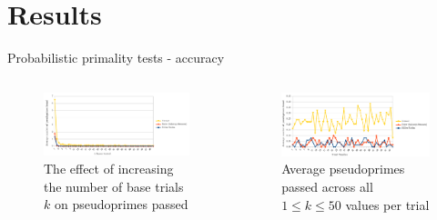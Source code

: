 \documentclass[pdf,aspectratio=169]{beamer}
\begin{document}
\section{Results}
\begin{frame}{Probabilistic primality tests - accuracy}
    \begin{columns}[t, onlytextwidth]
        \begin{column}{0.48\textwidth}
            \begin{figure}
                \setcounter{figure}{0}
                \caption{The effect of increasing the number of base trials $k$ on pseudoprimes passed}
                \centering
                \includegraphics[width=\textwidth]{pprimes_v_bases}
            \end{figure}
        \end{column}
        \begin{column}{0.48\textwidth}
            \begin{figure}
                \setcounter{figure}{1}
                \caption{Average pseudoprimes passed across all $1 \leq k \leq 50$ values per trial}
                \centering
                \includegraphics[width=\textwidth]{pprimes_v_trial}
            \end{figure}
        \end{column}
    \end{columns}
    \begin{outline}
        \pause
        \pause
    \end{outline}
\end{frame}
\end{document}
